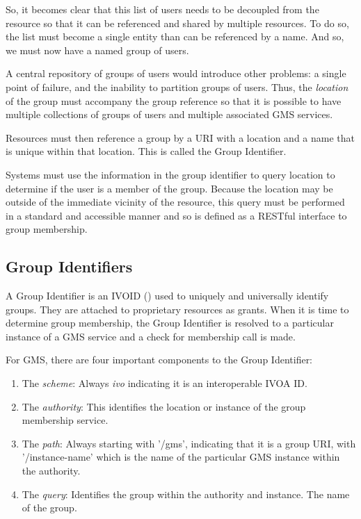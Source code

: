 \documentclass[11pt,a4paper]{ivoa}
\begin{document}
So, it becomes clear that this list of users needs to be decoupled from the resource so that it can be referenced and shared by multiple resources.  To do so, the list must become a single entity than can be referenced by a name.  And so, we must now have a named group of users.

A central repository of groups of users would introduce other problems:  a single point of failure, and the inability to partition groups of users.  Thus, the \emph{location} of the group must accompany the group reference so that it is possible to have multiple collections of groups of users and multiple associated GMS services.

Resources must then reference a group by a URI with a location and a name that is unique within that location.  This is called the Group Identifier.

Systems must use the information in the group identifier to query location to determine if the user is a member of the group.  Because the location may be outside of the immediate vicinity of the resource, this query must be performed in a standard and accessible manner and so is defined as a RESTful interface to group membership.

\subsection{Group Identifiers}

A Group Identifier is an IVOID (\citep{std:VOID2}) used to uniquely and universally identify groups.  They are attached to proprietary resources as grants.  When it is time to determine group membership, the Group Identifier is resolved to a particular instance of a GMS service and a check for membership call is made.

For GMS, there are four important components to the Group Identifier:

\begin{enumerate}
\item The \emph{scheme}: Always \emph{ivo} indicating it is an interoperable IVOA ID.
\item The \emph{authority}: This identifies the location or instance of the group membership service.
\item The \emph{path}: Always starting with '/gms', indicating that it is a group URI, with '/instance-name' which is the name of the particular GMS instance within the authority.
\item The \emph{query}: Identifies the group within the authority and instance.  The name of the group.
\end{enumerate}
\end{document}
